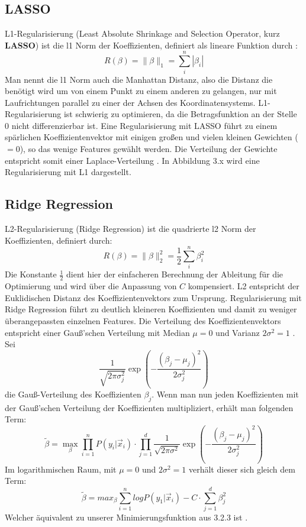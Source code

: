 \subsection{LASSO}
L1-Regularisierung (Least Absolute Shrinkage and Selection Operator, kurz \textbf{LASSO}) ist die l1 Norm der Koeffizienten, definiert als lineare Funktion durch \cite{LASSO}:
\begin{displaymath}
R(\beta) = \parallel \beta \parallel_1 = \sum_{i}^n|\beta_i|
\end{displaymath}
Man nennt die l1 Norm auch die Manhattan Distanz, also die Distanz die benötigt wird um von einem Punkt zu einem anderen zu gelangen, nur mit Laufrichtungen parallel zu einer der Achsen des Koordinatensystems. L1-Regularisierung ist schwierig zu optimieren, da die Betragsfunktion an der Stelle 0 nicht differenzierbar ist. Eine Regularisierung mit LASSO führt zu einem spärlichen Koeffizientenvektor mit einigen großen und vielen kleinen Gewichten ($=0$), so das wenige Features gewählt werden. Die Verteilung der Gewichte entspricht somit einer Laplace-Verteilung \cite{JUR}. In Abbildung 3.x wird eine Regularisierung mit L1 dargestellt.
\subsection{Ridge Regression}

L2-Regularisierung (Ridge Regression) ist die quadrierte l2 Norm der Koeffizienten, definiert durch:
\begin{displaymath}
R(\beta)= \parallel \beta \parallel_2^2= \dfrac{1}{2} \sum_{i}^n \beta_i^2
\end{displaymath}
Die Konstante $\frac{1}{2}$ dient hier der einfacheren Berechnung der Ableitung für die Optimierung und wird über die Anpassung von $C$ kompensiert. L2 entspricht der Euklidischen Distanz des Koeffizientenvektors zum Ursprung. Regularisierung mit Ridge Regression führt zu deutlich kleineren Koeffizienten und damit zu weniger überangepassten einzelnen Features. Die Verteilung des Koeffizientenvektors entspricht einer Gauß'schen Verteilung mit Median $\mu = 0$ und Varianz $ 2 \sigma^2 = 1$ \cite{JUR}.
Sei 
\begin{displaymath}
\dfrac{1}{\sqrt{2\pi \sigma_j^2}}\exp\left(-\dfrac{(\beta_j-\mu_j)^2}{2\sigma_j^2}\right)
\end{displaymath}
die Gauß-Verteilung des Koeffizienten $\beta_j$. Wenn man nun jeden Koeffizienten mit der Gauß'schen Verteilung der Koeffizienten multipliziert, erhält man folgenden Term:
\begin{displaymath}
\tilde{\beta} = \max_{\beta} \prod_{i=1}^n P(y_i | \vec x_i) \cdot \prod_{j=1}^d \dfrac{1}{\sqrt{2\pi \sigma^2}}\exp\left(-\dfrac{(\beta_j-\mu_j)^2}{2\sigma_j^2}\right)
\end{displaymath}
Im logarithmischen Raum, mit $\mu =0$ und $2\sigma^2 = 1$ verhält dieser sich gleich dem Term: 
\begin{displaymath}
\tilde{\beta} = max_\beta \sum_{i=1}^n logP(y_1 | \vec x_i)-C \cdot \sum_{j=1}^d \beta_j^2
\end{displaymath}
Welcher äquivalent zu unserer Minimierungsfunktion aus 3.2.3 ist \cite{JUR}.
